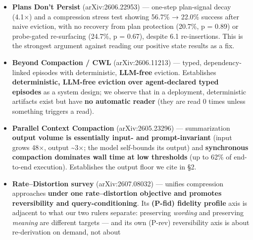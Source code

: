 \documentclass[
]{article}
\begin{document}
\begin{itemize}
  length, constraint phrasing and injection location, so the loss is
  \textbf{systematic rather than a bad setting} --- and they answer it
  on the extractor side (an SC-aware extractor). This is the closest
  prior statement of the §4 phenomenon, and it sharpens what is ours:
  they \textbf{inject} constraints into constructed scenarios and score
  \textbf{retention}; we measure \textbf{real deployment logs} under
  \textbf{two rulers} (13\% verbatim vs 91 / 77 / 53\% semantic, §4) and
  add what happens \textbf{after} erasure --- a near neighbour
  substituted with full confidence and no marker (§5) --- which a
  retention rate cannot show. Their headline (``most compactors do worse
  than no compaction'') is also the second independent argument against
  reading our positive state results as a fix.
\item
  \textbf{Plans Don't Persist} (arXiv:2606.22953) --- one-step
  plan-signal decay (4.1×) and a compression stress test showing 56.7\%
  → 22.0\% success after naive eviction, with no recovery from plan
  protection (20.7\%, p = 0.89) or probe-gated re-surfacing (24.7\%, p =
  0.67), despite 6.1 re-insertions. This is the strongest argument
  against reading our positive state results as a fix.
\item
  \textbf{Beyond Compaction / CWL} (arXiv:2606.11213) --- typed,
  dependency-linked episodes with deterministic, \textbf{LLM-free}
  eviction. Establishes \textbf{deterministic, LLM-free eviction over
  agent-declared typed episodes} as a system design; we observe that in
  a deployment, deterministic artifacts exist but have \textbf{no
  automatic reader} (they are read 0 times unless something triggers a
  read).
\item
  \textbf{Parallel Context Compaction} (arXiv:2605.23296) ---
  summarization \textbf{output volume is essentially input- and
  prompt-invariant} (input grows 48×, output \textasciitilde3×; the
  model self-bounds its output) and \textbf{synchronous compaction
  dominates wall time at low thresholds} (up to 62\% of end-to-end
  execution). Establishes the output floor we cite in §2.
\item
  \textbf{Rate--Distortion survey} (arXiv:2607.08032) --- unifies
  compression approaches \textbf{under one rate--distortion objective
  and promotes reversibility and query-conditioning}. Its
  \textbf{(P-fid) fidelity profile} axis is adjacent to what our two
  rulers separate: preserving \emph{wording} and preserving
  \emph{meaning} are different targets --- and its own (P-rev)
  reversibility axis is about re-derivation on demand, not about

\end{itemize}
\end{document}
